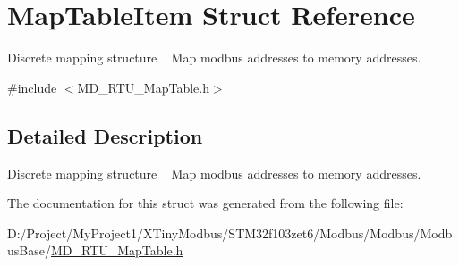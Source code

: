 \hypertarget{struct_map_table_item}{}\section{Map\+Table\+Item Struct Reference}
\label{struct_map_table_item}


Discrete mapping structure ~\newline
Map modbus addresses to memory addresses.  




{\ttfamily \#include $<$M\+D\+\_\+\+R\+T\+U\+\_\+\+Map\+Table.\+h$>$}



\subsection{Detailed Description}
Discrete mapping structure ~\newline
Map modbus addresses to memory addresses. 

The documentation for this struct was generated from the following file\+:\begin{DoxyCompactItemize}
\item 
D\+:/\+Project/\+My\+Project1/\+X\+Tiny\+Modbus/\+S\+T\+M32f103zet6/\+Modbus/\+Modbus/\+Modbus\+Base/\mbox{\hyperlink{_m_d___r_t_u___map_table_8h}{M\+D\+\_\+\+R\+T\+U\+\_\+\+Map\+Table.\+h}}\end{DoxyCompactItemize}
